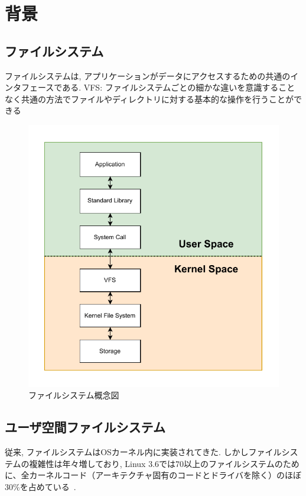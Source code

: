 \documentclass[a4paper,11pt]{jreport}
\begin{document}
\chapter{背景}

\section{ファイルシステム}
ファイルシステムは, アプリケーションがデータにアクセスするための共通のインタフェースである. 
VFS: ファイルシステムごとの細かな違いを意識することなく共通の方法でファイルやディレクトリに対する基本的な操作を行うことができる
\begin{figure}[h]
	\begin{minipage}[b]{1\columnwidth}
		\centering
		\includegraphics[width=0.9\linewidth]{./figure/filesystem.pdf}
		\caption{ファイルシステム概念図}
		\label{fig:Filesystem}
	\end{minipage}
\end{figure}

\section{ユーザ空間ファイルシステム}
従来, ファイルシステムはOSカーネル内に実装されてきた. しかしファイルシステムの複雑性は年々増しており,
Linux 3.6では70以上のファイルシステムのために、全カーネルコード（アーキテクチャ固有のコードとドライバを除く）のほぼ30\%を占めている~\cite{190583}.
\end{document}
